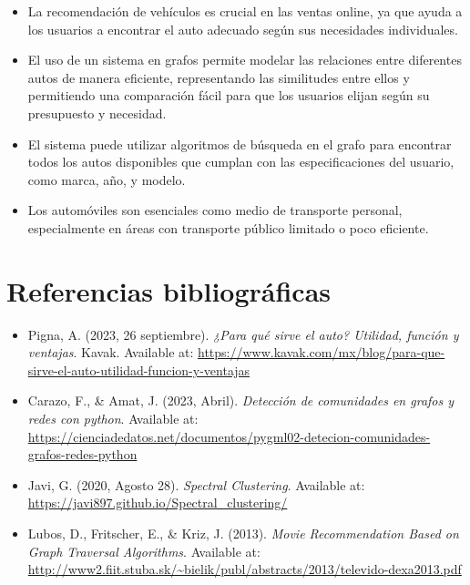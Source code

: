 \documentclass[12pt]{article}
\begin{document}
\begin{itemize}
    \item La recomendación de vehículos es crucial en las ventas online, ya que ayuda a los usuarios a encontrar el auto adecuado según sus necesidades individuales.
    \item El uso de un sistema en grafos permite modelar las relaciones entre diferentes autos de manera eficiente, representando las similitudes entre ellos y permitiendo una comparación fácil para que los usuarios elijan según su presupuesto y necesidad.
    \item El sistema puede utilizar algoritmos de búsqueda en el grafo para encontrar todos los autos disponibles que cumplan con las especificaciones del usuario, como marca, año, y modelo.
    \item Los automóviles son esenciales como medio de transporte personal, especialmente en áreas con transporte público limitado o poco eficiente.
\end{itemize}



\section{Referencias bibliográficas}
\begin{itemize}
    \item Pigna, A. (2023, 26 septiembre). \textit{¿Para qué sirve el auto? Utilidad, función y ventajas}. Kavak. Available at: \url{https://www.kavak.com/mx/blog/para-que-sirve-el-auto-utilidad-funcion-y-ventajas}
    \item Carazo, F., \& Amat, J. (2023, Abril). \textit{Detección de comunidades en grafos y redes con python}. Available at: \url{https://cienciadedatos.net/documentos/pygml02-detecion-comunidades-grafos-redes-python}
    \item Javi, G. (2020, Agosto 28). \textit{Spectral Clustering}. Available at: \url{https://javi897.github.io/Spectral_clustering/}
    \item Lubos, D., Fritscher, E., \& Kriz, J. (2013). \textit{Movie Recommendation Based on Graph Traversal Algorithms}. Available at: \url{http://www2.fiit.stuba.sk/~bielik/publ/abstracts/2013/televido-dexa2013.pdf}
\end{itemize}
\end{document}
